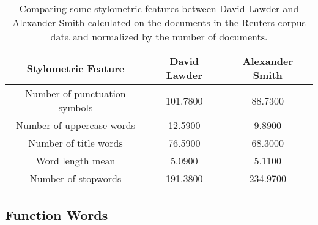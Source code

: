 \begin{table}[h!]
	\begin{center}  
		\caption[Comparing stylometric features of 2 authors in Reuters Corpus]{Comparing some stylometric features between David Lawder and Alexander Smith calculated on the documents in the Reuters corpus data and normalized by the number of documents.} 
		\label{tab:stylometricFeatRCV1}
		\begin{tabular}{|c | c | c |}
			\hline 
			Stylometric Feature & David Lawder & Alexander Smith \\
			\hline \hline
			Number of punctuation symbols & 101.7800 & 88.7300 \\ \hline
			Number of uppercase words & 12.5900  & 9.8900 \\ \hline
			Number of title words & 76.5900 & 68.3000 \\ \hline
			Word length mean & 5.0900 & 5.1100 \\ \hline
			Number of stopwords & 191.3800 & 234.9700 \\ \hline
		\end{tabular} 
	\end{center}
\end{table}

\subsection{Function Words}

